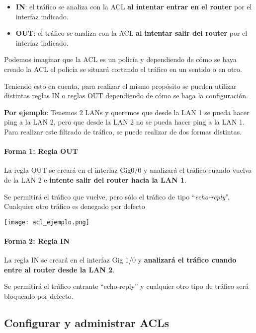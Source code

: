 \begin{itemize}
    \item \textbf{IN}: el tráfico se analiza con la ACL \textbf{al intentar entrar en el router} por el interfaz indicado.
    \item \textbf{OUT}: el tráfico se analiza con la ACL \textbf{al intentar salir del router} por el interfaz indicado.
\end{itemize}

Podemos imaginar que la ACL es un policía y dependiendo de cómo se haya creado la ACL el policía se situará cortando el tráfico en un sentido o en otro.

Teniendo esto en cuenta, para realizar el mismo propósito se pueden utilizar distintas reglas IN o reglas OUT dependiendo de cómo se haga la configuración.

\textbf{Por ejemplo}: Tenemos 2 LANs y queremos que desde la LAN 1 se pueda hacer ping a la LAN 2, pero que desde la LAN 2 no se pueda hacer ping a la LAN 1. Para realizar este filtrado de tráfico, se puede realizar de dos formas distintas.

\paragraph{Forma 1: Regla OUT}

La regla OUT se creará en el interfaz Gig0/0 y analizará el tráfico cuando vuelva de la LAN 2 e \textbf{intente salir del router hacia la LAN 1}.

Se permitirá el tráfico que vuelve, pero sólo el tráfico de tipo “\textit{echo-reply}”. Cualquier otro tráfico es denegado por defecto

\begin{center}
    \vspace{-15pt}
    \texttt{[image: acl\_ejemplo.png]}
    \vspace{-15pt}
\end{center}

\paragraph{Forma 2: Regla IN}
La regla IN se creará en el interfaz Gig 1/0 y \textbf{analizará el tráfico cuando entre al router desde la LAN 2}.

Se permitirá el tráfico entrante “echo-reply” y cualquier otro tipo de tráfico será bloqueado por defecto.


\subsection{Configurar y administrar ACLs}

